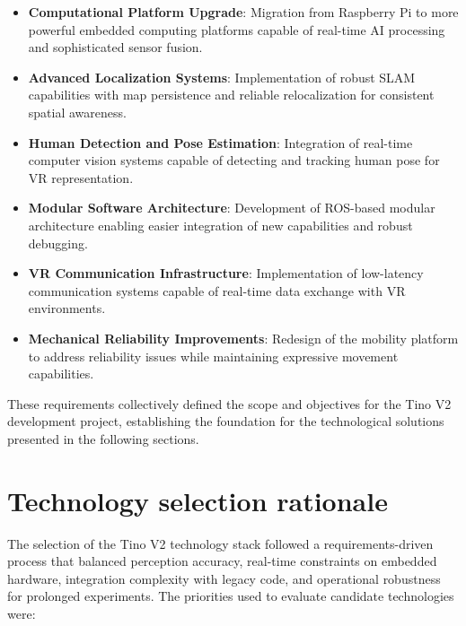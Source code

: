 \begin{itemize}
\item \textbf{Computational Platform Upgrade}: Migration from Raspberry Pi to more powerful embedded computing platforms capable of real-time AI processing and sophisticated sensor fusion.

\item \textbf{Advanced Localization Systems}: Implementation of robust SLAM capabilities with map persistence and reliable relocalization for consistent spatial awareness.

\item \textbf{Human Detection and Pose Estimation}: Integration of real-time computer vision systems capable of detecting and tracking human pose for VR representation.

\item \textbf{Modular Software Architecture}: Development of ROS-based modular architecture enabling easier integration of new capabilities and robust debugging.

\item \textbf{VR Communication Infrastructure}: Implementation of low-latency communication systems capable of real-time data exchange with VR environments.

\item \textbf{Mechanical Reliability Improvements}: Redesign of the mobility platform to address reliability issues while maintaining expressive movement capabilities.
\end{itemize}

These requirements collectively defined the scope and objectives for the Tino V2 development project, establishing the foundation for the technological solutions presented in the following sections.

\section{Technology selection rationale}

The selection of the Tino V2 technology stack followed a requirements-driven process that balanced perception accuracy, real-time constraints on embedded hardware, integration complexity with legacy code, and operational robustness for prolonged experiments. The priorities used to evaluate candidate technologies were:

